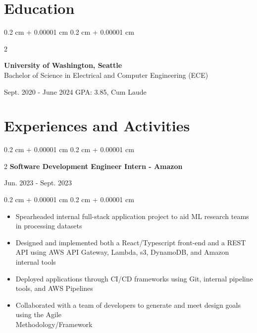 \documentclass[10pt, letterpaper]{article}
\newenvironment{highlightsforbulletentries}{
    \begin{itemize}[
        topsep=0.10 cm,
        parsep=0.10 cm,
        partopsep=0pt,
        itemsep=0pt,
        leftmargin=10pt
    ]
}{
    \end{itemize}
} %
\newenvironment{onecolentry}{
    \begin{adjustwidth}{
        0.2 cm + 0.00001 cm
    }{
        0.2 cm + 0.00001 cm
    }
}{
    \end{adjustwidth}
} %
\newenvironment{twocolentry}[2][]{
    \onecolentry
    \def\secondColumn{#2}
    \setcolumnwidth{\fill, 4.5 cm}
    \begin{paracol}{2}
}{
    \switchcolumn \raggedleft \secondColumn
    \end{paracol}
    \endonecolentry
} %
\begin{document}
    \section{Education}
        \begin{twocolentry}{
            Sept. 2020 - June 2024
            GPA: 3.85, Cum Laude
        }
            \textbf{University of Washington, Seattle}\\
            Bachelor of Science in Electrical and Computer Engineering (ECE)
        \end{twocolentry}

    \section{Experiences and Activities}
        \begin{twocolentry}{
            Jun. 2023 - Sept. 2023
        }{
            \textbf{Software Development Engineer Intern - Amazon}
        }
        \end{twocolentry}
        \vspace{0.1 cm}
        \begin{onecolentry}
            \begin{highlightsforbulletentries}
                \item Spearheaded internal full-stack application project to aid ML research teams in processing
                datasets
                \item Designed and implemented both a React/Typescript front-end and a REST API using AWS API Gateway,
                Lambda, s3, DynamoDB, and Amazon internal tools
                \item Deployed applications through CI/CD frameworks using Git, internal pipeline tools, and AWS
                Pipelines
                \item Collaborated with a team of developers to generate and meet design goals using the Agile\\
                Methodology/Framework
            \end{highlightsforbulletentries}
        \end{onecolentry}

        \vspace{0.2 cm}
\end{document}
